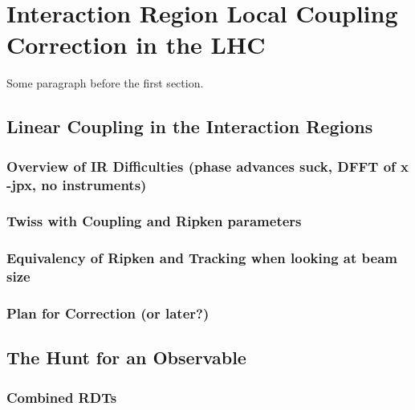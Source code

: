 
\chapter{Interaction Region Local Coupling Correction in the LHC} %

\label{Chapter3} %


Some paragraph before the first section.


\section{Linear Coupling in the Interaction Regions}

\subsection{Overview of IR Difficulties (phase advances suck, DFFT of x -jpx, no instruments)}

\subsection{Twiss with Coupling and Ripken parameters}

\subsection{Equivalency of Ripken and Tracking when looking at beam size}

\subsection{Plan for Correction (or later?)}


\section{The Hunt for an Observable}

\subsection{Combined RDTs}

